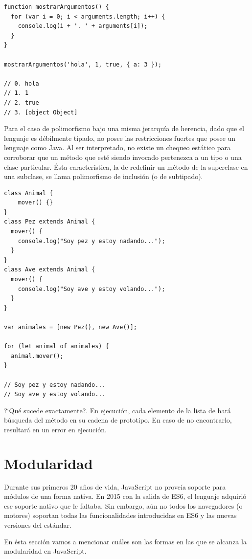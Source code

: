\begin{lstlisting}[title={Analizando \code{arguments}}]
function mostrarArgumentos() {
  for (var i = 0; i < arguments.length; i++) {
    console.log(i + '. ' + arguments[i]);
  }
}

mostrarArgumentos('hola', 1, true, { a: 3 });

// 0. hola
// 1. 1
// 2. true
// 3. [object Object]
\end{lstlisting}

Para el caso de polimorfismo bajo una misma jerarquía de herencia, dado que el lenguaje es débilmente tipado, no posee las restricciones fuertes que posee un lenguaje como Java. Al ser interpretado, no existe un chequeo estático para corroborar que un método que esté siendo invocado pertenezca a un tipo o una clase particular. Ésta característica, la de redefinir un método de la superclase en una subclase, se llama polimorfismo de inclusión (o de subtipado).

\begin{lstlisting}
class Animal {
	mover() {}
}
class Pez extends Animal {
  mover() {
    console.log("Soy pez y estoy nadando...");
  }
}
class Ave extends Animal {
  mover() {
    console.log("Soy ave y estoy volando...");
  }
}

var animales = [new Pez(), new Ave()];

for (let animal of animales) {
  animal.mover();
}

// Soy pez y estoy nadando...
// Soy ave y estoy volando...
\end{lstlisting}

?`Qué sucede exactamente?. En ejecución, cada elemento de la lista de  hará búsqueda del método  en su cadena de prototipo. En caso de no encontrarlo, resultará en un error en ejecución. 

\section{Modularidad}

Durante sus primeros 20 años de vida, JavaScript no proveía soporte para módulos de una forma nativa. En 2015 con la salida de ES6, el lenguaje adquirió ese soporte nativo que le faltaba. Sin embargo, aún no todos los navegadores (o motores) soportan todas las funcionalidades introducidas en ES6 y las nuevas versiones del estándar.

En ésta sección vamos a mencionar cuáles son las formas en las que se alcanza la modularidad en JavaScript.

